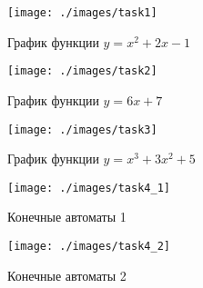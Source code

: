 


	\begin{figure}[h!]
		\centering
		\texttt{[image: ./images/task1]}
		\caption{График функции $y=x^2 + 2x - 1$}
	\end{figure}
	\begin{figure}[h!]
		\centering
		\texttt{[image: ./images/task2]}
		\caption{График функции $y=6x + 7$}
	\end{figure}
	\begin{figure}[h!]
		\centering
		\texttt{[image: ./images/task3]}
		\caption{График функции $y=x^3 + 3x^2 + 5$}
	\end{figure}
	\begin{figure}[h!]
		\centering
		\texttt{[image: ./images/task4\_1]}
		\caption{Конечные автоматы 1}
	\end{figure}
	\begin{figure}[h!]
		\centering
		\texttt{[image: ./images/task4\_2]}
		\caption{Конечные автоматы 2}
	\end{figure}

